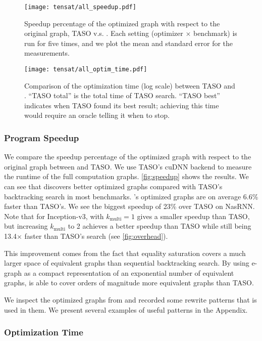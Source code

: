\begin{figure}
  \centering
  \texttt{[image: tensat/all\_speedup.pdf]}
  \caption{
    Speedup percentage of the optimized graph with respect to the original graph, TASO v.s. \ourname{}.
    Each setting (optimizer $\times$ benchmark) is run for five times, and we plot the mean and standard error for the measurements.
  }\label{fig:speedup}
  \vspace{2em}

  \texttt{[image: tensat/all\_optim\_time.pdf]}
  \caption{
    Comparison of the optimization time (log scale) between TASO and \ourname{}.
    ``TASO total'' is the total time of TASO search.
    ``TASO best'' indicates when TASO found its best result;
    achieving this time would require an oracle telling it when to stop.
  }\label{fig:overhead}
\end{figure}

\subsubsection{Program Speedup}
\label{sec:speedup}

We compare the speedup percentage of the optimized graph with respect to the original graph between \ourname{} and TASO.
We use TASO's cuDNN backend to measure the runtime of the full computation graphs.
\autoref{fig:speedup} shows the results.
We can see that \ourname{} discovers better optimized graphs compared with TASO's backtracking search in most benchmarks.
\ourname{}'s optimized graphs are on average 6.6\% faster than TASO's. We see the biggest speedup of 23\% over TASO on NasRNN.
Note that for Inception-v3, \ourname{} with $k_{\textrm{multi}}=1$ gives a smaller speedup than TASO,
but increasing $k_{\textrm{multi}}$ to 2 achieves a better speedup than TASO
while still being 13.4$\times$ faster than TASO's search (see \autoref{fig:overhead}).

This improvement comes from the fact that equality saturation covers a much larger space of equivalent graphs than sequential backtracking search.
By using e-graph as a compact representation of an exponential number of equivalent graphs, \ourname{} is able to cover orders of magnitude more equivalent graphs than TASO.

We inspect the optimized graphs from \ourname{} and recorded some rewrite patterns that is used in them.
We present several examples of useful patterns in the Appendix.

\subsubsection{Optimization Time}
\label{sec:time}

